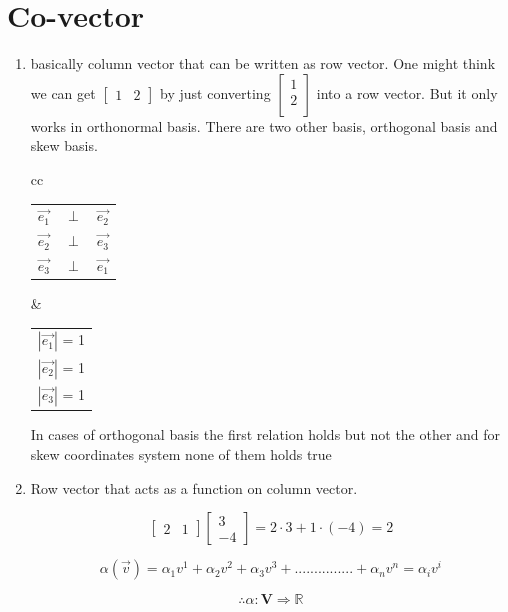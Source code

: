 \documentclass{article}
\begin{document}
	\section*{Co-vector}
		\begin{enumerate}
			\item basically column vector that can be written as row vector. One might think we can get  $\begin{bmatrix}
				1 & 2 
			\end{bmatrix}$ by just converting $\begin{bmatrix}
			1 \\
			2\\
		\end{bmatrix}$ into a row vector. But it only works in orthonormal basis. There are two other basis, orthogonal basis and skew basis. 
	
		\begin{center}
			\begin{tabular}{cc}
				\begin{tabular}{ccc}
					$\overrightarrow{e_{1}}$ & $\perp$ & $\overrightarrow{e_{2}}$\\
					$\overrightarrow{e_{2}}$ & $\perp$ & $\overrightarrow{e_{3}}$\\ 
					$\overrightarrow{e_{3}}$ & $\perp$ & $\overrightarrow{e_{1}}$\\
				\end{tabular} & \begin{tabular}{c}
					$|\overrightarrow{e_{1}}|$  = 1\\
					$|\overrightarrow{e_{2}}|$  = 1\\ 
					$|\overrightarrow{e_{3}}|$  = 1\\
				\end{tabular}
			\end{tabular}
		\end{center}
	
		In cases of orthogonal basis the first relation holds but not the other and for skew coordinates system none of them holds true
		
		\item Row vector that acts as a function on column vector.
		
		$$\begin{bmatrix}
			2 & 1
		\end{bmatrix}\begin{bmatrix}
		3 \\
		-4
	\end{bmatrix} = 2 \cdot3  + 1\cdot  (-4) = 2$$

	$$\alpha(\overrightarrow{v}) = \alpha_{1}v^{1} + \alpha_{2}v^{2} + \alpha_{3}v^{3} + ............... + \alpha_{n}v^{n} = \alpha_{i}v^{i}$$
	
	$$\therefore \alpha : \mathbf{V} \Rightarrow \mathbb{R}$$
		\end{enumerate}
	
\end{document}
